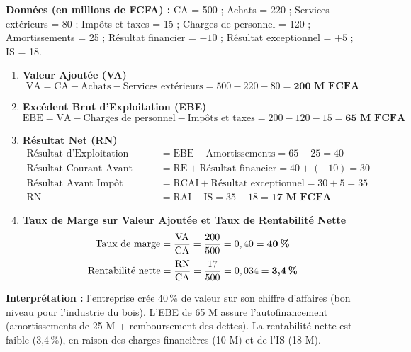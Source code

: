 \documentclass[11pt]{article}
\begin{document}
\begin{corrige}
\textbf{Données (en millions de FCFA) :} CA = 500 ; Achats = 220 ; Services extérieurs = 80 ; Impôts et taxes = 15 ; Charges de personnel = 120 ; Amortissements = 25 ; Résultat financier = $-10$ ; Résultat exceptionnel = $+5$ ; IS = 18.

\begin{enumerate}
    \item \textbf{Valeur Ajoutée (VA)}
    \[ \text{VA} = \text{CA} - \text{Achats} - \text{Services extérieurs} = 500 - 220 - 80 = \textbf{200 M FCFA} \]

    \item \textbf{Excédent Brut d'Exploitation (EBE)}
    \[ \text{EBE} = \text{VA} - \text{Charges de personnel} - \text{Impôts et taxes} = 200 - 120 - 15 = \textbf{65 M FCFA} \]

    \item \textbf{Résultat Net (RN)}
    \begin{align*}
    \text{Résultat d'Exploitation (RE)} &= \text{EBE} - \text{Amortissements} = 65 - 25 = 40 \\
    \text{Résultat Courant Avant Impôt (RCAI)} &= \text{RE} + \text{Résultat financier} = 40 + (-10) = 30 \\
    \text{Résultat Avant Impôt (RAI)} &= \text{RCAI} + \text{Résultat exceptionnel} = 30 + 5 = 35 \\
    \text{RN} &= \text{RAI} - \text{IS} = 35 - 18 = \textbf{17 M FCFA}
    \end{align*}

    \item \textbf{Taux de Marge sur Valeur Ajoutée et Taux de Rentabilité Nette}
    \[ \text{Taux de marge} = \frac{\text{VA}}{\text{CA}} = \frac{200}{500} = 0,40 = \textbf{40\,\%} \]
    \[ \text{Rentabilité nette} = \frac{\text{RN}}{\text{CA}} = \frac{17}{500} = 0,034 = \textbf{3,4\,\%} \]
\end{enumerate}
\textbf{Interprétation :} l'entreprise crée 40\,\% de valeur sur son chiffre d'affaires (bon niveau pour l'industrie du bois). L'EBE de 65 M assure l'autofinancement (amortissements de 25 M + remboursement des dettes). La rentabilité nette est faible (3,4\,\%), en raison des charges financières (10 M) et de l'IS (18 M).
\end{corrige}
\end{document}
